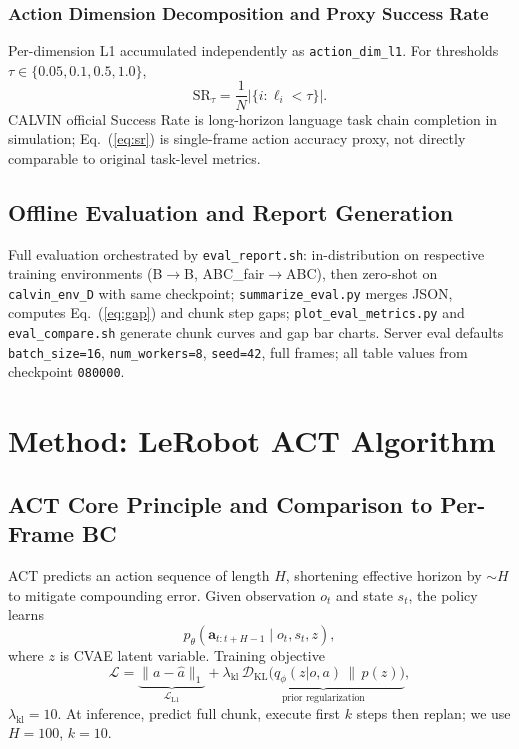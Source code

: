 \documentclass[10pt,twocolumn,letterpaper]{article}
\begin{document}
\subsubsection{Action Dimension Decomposition and Proxy Success Rate}

Per-dimension L1 accumulated independently as \texttt{action\_dim\_l1}. For thresholds $\tau\in\{0.05,0.1,0.5,1.0\}$,
\begin{equation}
  \mathrm{SR}_{\tau} = \frac{1}{N}\bigl|\{i : \ell_i < \tau\}\bigr|.
  \label{eq:sr}
\end{equation}
CALVIN official Success Rate is long-horizon language task chain completion in simulation\cite{mees2022calvin}; Eq.~(\ref{eq:sr}) is single-frame action accuracy proxy, not directly comparable to original task-level metrics.

\subsection{Offline Evaluation and Report Generation}

Full evaluation orchestrated by \texttt{eval\_report.sh}: in-distribution on respective training environments (B$\to$B, ABC\_fair$\to$ABC), then zero-shot on \texttt{calvin\_env\_D} with same checkpoint; \texttt{summarize\_eval.py} merges JSON, computes Eq.~(\ref{eq:gap}) and chunk step gaps; \texttt{plot\_eval\_metrics.py} and \texttt{eval\_compare.sh} generate chunk curves and gap bar charts. Server eval defaults \texttt{batch\_size=16}, \texttt{num\_workers=8}, \texttt{seed=42}, full frames; all table values from checkpoint \texttt{080000}.

\section{Method: LeRobot ACT Algorithm}

\subsection{ACT Core Principle and Comparison to Per-Frame BC}

ACT predicts an action sequence of length $H$, shortening effective horizon by $\sim H$ to mitigate compounding error\cite{ross2011dagger,zhao2023learning}. Given observation $o_t$ and state $s_t$, the policy learns
\begin{equation}
  p_\theta(\mathbf{a}_{t:t+H-1} \mid o_t, s_t, z),
  \label{eq:act}
\end{equation}
where $z$ is CVAE latent variable. Training objective
\begin{equation}
  \mathcal{L} = \underbrace{\| a - \hat{a} \|_1}_{\mathcal{L}_{\mathrm{L1}}}
  + \lambda_{\mathrm{kl}}\,
  \underbrace{\mathcal{D}_{\mathrm{KL}}\bigl(q_\phi(z|o,a)\,\|\,p(z)\bigr)}_{\text{prior regularization}},
  \label{eq:loss}
\end{equation}
$\lambda_{\mathrm{kl}}{=}10$. At inference, predict full chunk, execute first $k$ steps then replan; we use $H{=}100$, $k{=}10$.
\end{document}
